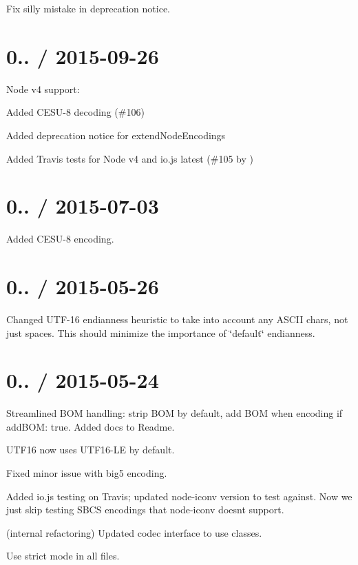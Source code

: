 
\begin{DoxyItemize}
\item Fix silly mistake in deprecation notice.
\end{DoxyItemize}

\section*{0.. / 2015-\/09-\/26}


\begin{DoxyItemize}
\item Node v4 support\+:
\begin{DoxyItemize}
\item Added C\+E\+S\+U-\/8 decoding (\#106)
\item Added deprecation notice for {\ttfamily extend\+Node\+Encodings}
\item Added Travis tests for Node v4 and io.\+js latest (\#105 by )
\end{DoxyItemize}
\end{DoxyItemize}

\section*{0.. / 2015-\/07-\/03}


\begin{DoxyItemize}
\item Added C\+E\+S\+U-\/8 encoding.
\end{DoxyItemize}

\section*{0.. / 2015-\/05-\/26}


\begin{DoxyItemize}
\item Changed U\+T\+F-\/16 endianness heuristic to take into account any A\+S\+C\+II chars, not just spaces. This should minimize the importance of \char`\"{}default\char`\"{} endianness.
\end{DoxyItemize}

\section*{0.. / 2015-\/05-\/24}


\begin{DoxyItemize}
\item Streamlined B\+OM handling\+: strip B\+OM by default, add B\+OM when encoding if add\+B\+OM\+: true. Added docs to Readme.
\item U\+T\+F16 now uses U\+T\+F16-\/\+LE by default.
\item Fixed minor issue with big5 encoding.
\item Added io.\+js testing on Travis; updated node-\/iconv version to test against. Now we just skip testing S\+B\+CS encodings that node-\/iconv doesn\textquotesingle{}t support.
\item (internal refactoring) Updated codec interface to use classes.
\item Use strict mode in all files.
\end{DoxyItemize}

